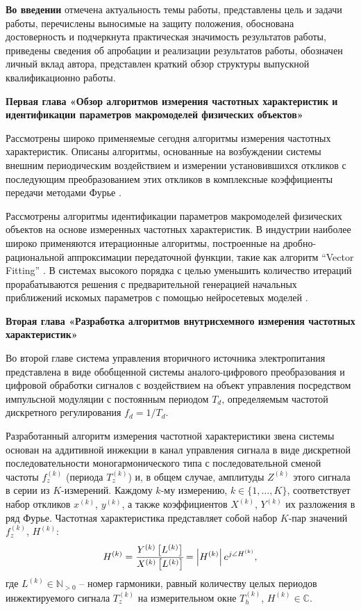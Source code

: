 \documentclass[a4paper, 14pt]{extarticle}
\begin{document}
    \textbf{Во введении} отмечена актуальность темы работы, представлены цель и задачи работы, перечислены выносимые на защиту положения, обоснована достоверность и подчеркнута практическая значимость результатов работы, приведены сведения об апробации и реализации результатов работы, обозначен личный вклад автора, представлен краткий обзор структуры выпускной квалификационно работы.
    
    \noindent\textbf{Первая глава «Обзор алгоритмов измерения частотных характеристик и идентификации параметров макромоделей физических объектов»}\par
    Рассмотрены широко применяемые сегодня алгоритмы измерения частотных характеристик. Описаны алгоритмы, основанные на возбуждении системы внешним периодическим воздействием и измерении установившихся откликов с последующим преобразованием этих откликов в комплексные коэффициенты передачи методами Фурье \cite{Zhang2025}.
    
    Рассмотрены алгоритмы идентификации параметров макромоделей физических объектов на основе измеренных частотных характеристик. В индустрии наиболее широко применяются итерационные алгоритмы, построенные на дробно-рациональной аппроксимации передаточной функции, такие как алгоритм \enquote{Vector Fitting} \cite{triverio2019vector}. В системах высокого порядка с целью уменьшить количество итераций прорабатываются решения с предварительной генерацией начальных приближений искомых параметров с помощью нейросетевых моделей \cite{hua2023deep}.

    \noindent\textbf{Вторая глава «Разработка алгоритмов внутрисхемного измерения частотных характеристик»}\par
    Во второй главе система управления вторичного источника электропитания представлена в виде обобщенной системы аналого-цифрового преобразования и цифровой обработки сигналов с воздействием на объект управления посредством импульсной модуляции с постоянным периодом ${T_d}$, определяемым частотой дискретного регулирования ${f_d = 1 / T_d}$.
  
    Разработанный алгоритм измерения частотной характеристики звена системы основан на аддитивной инжекции в канал управления сигнала в виде дискретной последовательности моногармонического типа с последовательной сменой частоты ${f^{(k)}_z}$ (периода ${T^{(k)}_z}$) и, в общем случае, амплитуды ${Z^{(k)}}$ этого сигнала в серии из $K$-измерений. Каждому $k$-му измерению, ${k \in \{1, \dots, K\}}$, соответствует набор откликов ${x^{(k)}}$, ${y^{(k)}}$, а также коэффициентов ${X^{(k)}}$, ${Y^{(k)}}$ их разложения в ряд Фурье. Частотная характеристика представляет собой набор $K$-пар значений ${f^{(k)}_z}$, ${H^{(k)}}$:
    \begin{equation*}
        H^{(k)} = \cfrac{Y^{(k)}\left[L^{(k)}\right]}{X^{(k)}\left[L^{(k)}\right]} = \left| H^{(k)} \right| e^{j \angle H^{(k)}},
    \end{equation*}
    где ${L^{(k)} \in \mathbb{N}_{>0}}$ -- номер гармоники, равный количеству целых периодов инжектируемого сигнала ${{T^{(k)}_{z}}}$ на измерительном окне ${T^{(k)}_{h}}$, ${H^{(k)} \in \mathbb{C}}$.
    
\end{document}
